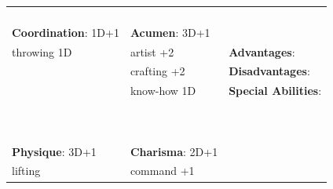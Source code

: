 \documentclass[10pt]{article}
\begin{document}
\begin{table}
\begin{tabular}{m{156pt} m{156pt} m{156pt}}
 \hrulefill &  \hrulefill & \\

 \hrulefill &  \hrulefill & \\

 \hrulefill &  \hrulefill & \\

 \hrulefill &  \hrulefill & \\


\textbf{Coordination}: 1D+1 \hrulefill & \textbf{Acumen}: 3D+1 \hrulefill     & \hrulefill \\

throwing          1D \hrulefill & artist            +2 \hrulefill & \textbf{Advantages}: \hrulefill \\

 \hrulefill & crafting          +2 \hrulefill & \textbf{Disadvantages}: \hrulefill \\

 \hrulefill & know-how          1D \hrulefill & \textbf{Special Abilities}: \hrulefill \\

 \hrulefill &  \hrulefill &  \hrulefill \\

 \hrulefill &  \hrulefill &  \hrulefill \\

 \hrulefill &  \hrulefill &  \hrulefill \\

 \hrulefill &  \hrulefill &  \hrulefill \\

 \hrulefill &  \hrulefill &  \hrulefill \\

 \hrulefill &  \hrulefill &  \hrulefill \\

 \hrulefill &  \hrulefill &  \hrulefill \\

 \hrulefill &  \hrulefill &  \hrulefill \\

 \hrulefill &  \hrulefill &  \hrulefill \\

 \hrulefill &  \hrulefill &  \hrulefill \\


\textbf{Physique}: 3D+1 \hrulefill & \textbf{Charisma}: 2D+1 \hrulefill     &  \hrulefill \\

lifting              \hrulefill & command           +1 \hrulefill &  \hrulefill \\


\end{tabular}
\end{table}
\end{document}
